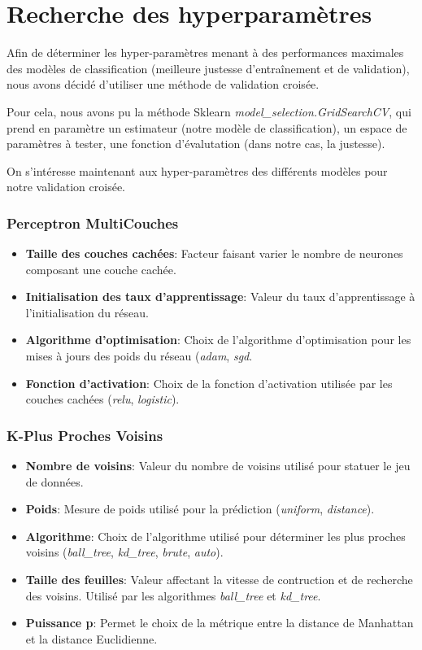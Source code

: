 \section{Recherche des hyperparamètres}
Afin de déterminer les hyper-paramètres menant à des performances maximales des modèles de classification (meilleure justesse d'entraînement et de validation), nous avons décidé d'utiliser une méthode de validation croisée. 

Pour cela, nous avons pu la méthode Sklearn \emph{model\_selection.GridSearchCV}, qui prend en paramètre un estimateur (notre modèle de classification), un espace de paramètres à tester, une fonction d'évalutation (dans notre cas, la justesse).

On s'intéresse maintenant aux hyper-paramètres des différents modèles pour notre validation croisée. 

\subsubsection*{Perceptron MultiCouches}
\begin{itemize}
	\item \textbf{Taille des couches cachées}: Facteur faisant varier le nombre de neurones composant une couche cachée.
	\item \textbf{Initialisation des taux d'apprentissage}: Valeur du taux d'apprentissage à l'initialisation du réseau. 
	\item \textbf{Algorithme d'optimisation}: Choix de l'algorithme d'optimisation pour les mises à jours des poids du réseau (\emph{adam}, \emph{sgd}.
	\item \textbf{Fonction d'activation}: Choix de la fonction d'activation utilisée par les couches cachées (\emph{relu}, \emph{logistic}).
\end{itemize}

\subsubsection*{K-Plus Proches Voisins}
\begin{itemize}
	\item \textbf{Nombre de voisins}: Valeur du nombre de voisins utilisé pour statuer le jeu de données.
	\item \textbf{Poids}: Mesure de poids utilisé pour la prédiction (\emph{uniform}, \emph{distance}). 
	\item \textbf{Algorithme}: Choix de l'algorithme utilisé pour déterminer les plus proches voisins (\emph{ball\_tree}, \emph{kd\_tree}, \emph{brute}, \emph{auto}).
	\item \textbf{Taille des feuilles}: Valeur affectant la vitesse de contruction et de recherche des voisins. Utilisé par les algorithmes \emph{ball\_tree} et \emph{kd\_tree}.
	\item \textbf{Puissance p}: Permet le choix de la métrique entre la distance de Manhattan et la distance Euclidienne.
\end{itemize}

